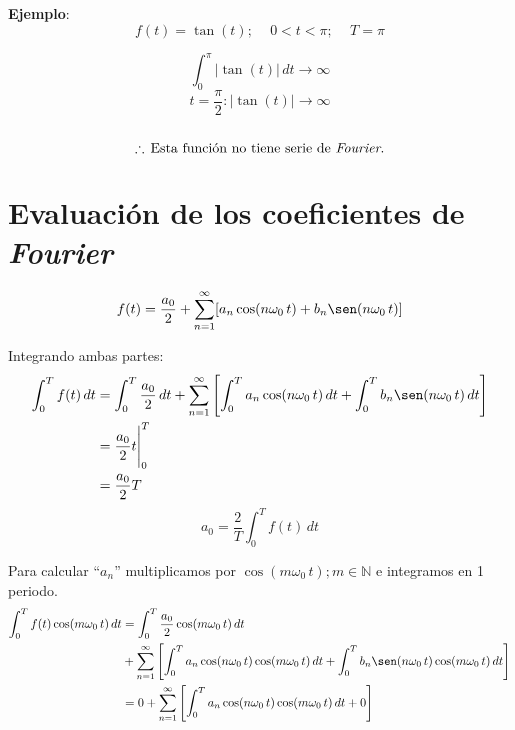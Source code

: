 \textbf{Ejemplo}:
\begin{equation*}
    f(t)=\tan(t);\quad\,0<t<\pi;\quad\,T=\pi
\end{equation*}
\begin{figure}[H]
    \centering
    
\end{figure}
\begin{equation*}
    \int_0^\pi|\tan(t)|\,dt\rightarrow\infty
\end{equation*}
\begin{equation*}
    t=\frac{\pi}{2}:|\tan(t)|\rightarrow\infty
\end{equation*}
\\
\begin{equation*}
    \therefore\,\text{Esta función no tiene serie de \emph{Fourier}.}
\end{equation*}

\section{Evaluación de los coeficientes de \emph{Fourier}}
\begin{equation*}
    f(t)=\frac{a_0}{2}+
    \sum_{n=1}^{\infty}[a_n\cos(n\omega_0\,t)+b_n\sen(n\omega_0\,t)]
\end{equation*}

Integrando ambas partes:
\begin{equation*}
\begin{split}
    \int_{0}^{T}f(t)\,dt
        &=\int_{0}^{T}\frac{a_0}{2}\,dt+
          \sum_{n=1}^{\infty}\left[\int_{0}^{T}a_n\cos(n\omega_0\,t)\,dt+
          \int_{0}^{T}b_n\sen(n\omega_0\,t)\,dt\right]\\
        &=\frac{a_0}{2}t\Biggr|_{0}^{T}\\
        &=\frac{a_0}{2}T\\
\end{split}
\end{equation*}
\begin{equation}
    a_0=\frac{2}{T}\int_{0}^{T}f(t)\,dt
\end{equation}

Para calcular ``$a_n$'' multiplicamos por $\cos(m\omega_0\,t);m\in\mathbb{N}$ e
integramos en 1 periodo.
\begin{equation*}
\begin{split}
    \int_{0}^{T}f(t)\cos(m\omega_0\,t)\,dt
        &=\int_{0}^{T}\frac{a_0}{2}\cos(m\omega_0\,t)\,dt\\
        &+\sum_{n=1}^{\infty}\left[
          \int_{0}^{T}a_n\cos(n\omega_0\,t)\cos(m\omega_0\,t)\,dt+
          \int_{0}^{T}b_n\sen(n\omega_0\,t)\cos(m\omega_0\,t)\,dt\right]\\
        &=0+\sum_{n=1}^{\infty}\left[
          \int_{0}^{T}a_n\cos(n\omega_0\,t)\cos(m\omega_0\,t)\,dt+0\right]\\
\end{split}
\end{equation*}


